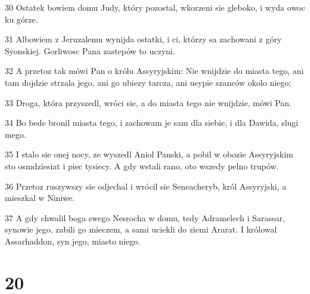 \par 30 Ostatek bowiem domu Judy, który pozostal, wkorzeni sie gleboko, i wyda owoc ku górze.
\par 31 Albowiem z Jeruzalemu wynijda ostatki, i ci, którzy sa zachowani z góry Syonskiej. Gorliwosc Pana zastepów to uczyni.
\par 32 A przetoz tak mówi Pan o królu Assyryjskim: Nie wnijdzie do miasta tego, ani tam dojdzie strzala jego, ani go ubiezy tarcza, ani usypie szanców okolo niego;
\par 33 Droga, która przyszedl, wróci sie, a do miasta tego nie wnijdzie, mówi Pan.
\par 34 Bo bede bronil miasta tego, i zachowam je sam dla siebie, i dla Dawida, slugi mego.
\par 35 I stalo sie onej nocy, ze wyszedl Aniol Panski, a pobil w obozie Assyryjskim sto osmdziesiat i piec tysiecy. A gdy wstali rano, oto wszedy pelno trupów.
\par 36 Przetoz ruszywszy sie odjechal i wrócil sie Seneacheryb, król Assyryjski, a mieszkal w Niniwe.
\par 37 A gdy chwalil boga swego Nesrocha w domu, tedy Adramelech i Sarassar, synowie jego, zabili go mieczem, a sami uciekli do ziemi Ararat. I królowal Assarhaddon, syn jego, miasto niego.

\chapter{20}

